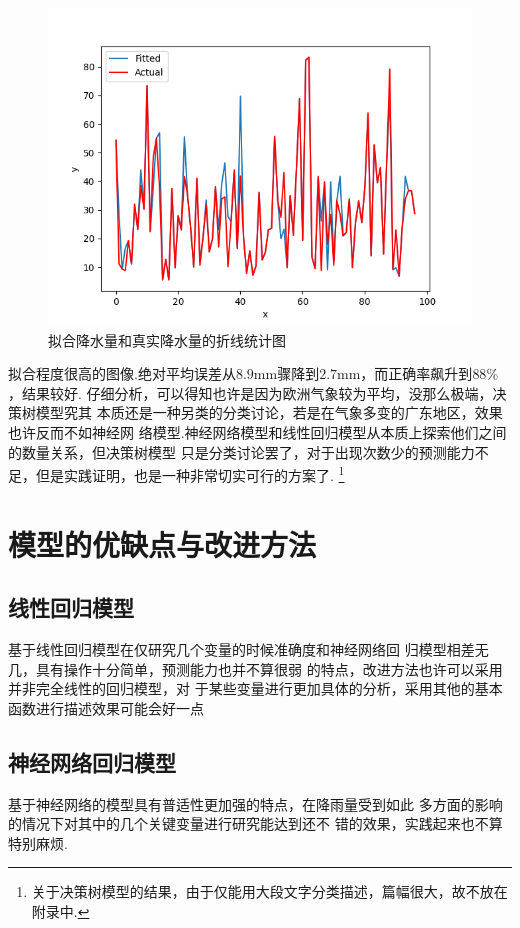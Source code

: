 \documentclass[UTF8, a4paper]{ctexart}
\begin{document}
\begin{figure}[h!]
	\centering
	\includegraphics[scale=0.3]{very_success.png}
	\caption{拟合降水量和真实降水量的折线统计图}\label{pic10}
\end{figure}

拟合程度很高的图像.绝对平均误差从$8.9$\si{\milli\meter}骤降到$2.7$\si{\milli\meter}，而正确率飙升到$88\%$，结果较好.
仔细分析，可以得知也许是因为欧洲气象较为平均，没那么极端，决策树模型究其
本质还是一种另类的分类讨论，若是在气象多变的广东地区，效果也许反而不如神经网
络模型.神经网络模型和线性回归模型从本质上探索他们之间的数量关系，但决策树模型
只是分类讨论罢了，对于出现次数少的预测能力不足，但是实践证明，也是一种非常切实可行的方案了.
\footnote{关于决策树模型的结果，由于仅能用大段文字分类描述，篇幅很大，故不放在附录中.}



\section{模型的优缺点与改进方法}

\subsection{线性回归模型}
基于线性回归模型在仅研究几个变量的时候准确度和神经网络回
归模型相差无几，具有操作十分简单，预测能力也并不算很弱
的特点，改进方法也许可以采用并非完全线性的回归模型，对
于某些变量进行更加具体的分析，采用其他的基本函数进行描述效果可能会好一点

\subsection{神经网络回归模型}
基于神经网络的模型具有普适性更加强的特点，在降雨量受到如此
多方面的影响的情况下对其中的几个关键变量进行研究能达到还不
错的效果，实践起来也不算特别麻烦.
\end{document}

